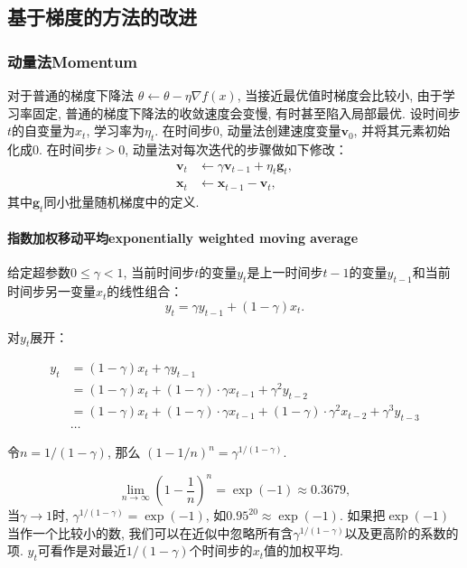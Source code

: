 \subsection{基于梯度的方法的改进}
 \subsubsection{动量法Momentum}
 对于普通的梯度下降法 $\theta \leftarrow \theta - \eta \nabla f(x)$,  当接近最优值时梯度会比较小, 由于学习率固定, 普通的梯度下降法的收敛速度会变慢, 有时甚至陷入局部最优.   
设时间步$t$的自变量为${x}_t$, 学习率为$\eta_t$. 
在时间步$0$, 动量法创建速度变量$\mathbf{v}_0$, 并将其元素初始化成0. 在时间步$t>0$, 动量法对每次迭代的步骤做如下修改：
 $$
 \begin{aligned}
 \mathbf{v}_t &\leftarrow \gamma \mathbf{v}_{t-1} + \eta_t \mathbf{g}_t,  \\
 \mathbf{x}_t &\leftarrow \mathbf{x}_{t-1} - \mathbf{v}_t, 
 \end{aligned}
 $$
 其中$\mathbf{g}_t$同小批量随机梯度中的定义.

 \paragraph{指数加权移动平均exponentially weighted moving average}
 给定超参数$0 \leq \gamma < 1$, 当前时间步$t$的变量$y_t$是上一时间步$t-1$的变量$y_{t-1}$和当前时间步另一变量$x_t$的线性组合：
 $$y_t = \gamma y_{t-1} + (1-\gamma) x_t.$$

对$y_t$展开：

 $$
 \begin{aligned}
 y_t  &= (1-\gamma) x_t + \gamma y_{t-1}\\
          &= (1-\gamma)x_t + (1-\gamma) \cdot \gamma x_{t-1} + \gamma^2y_{t-2}\\
          &= (1-\gamma)x_t + (1-\gamma) \cdot \gamma x_{t-1} + (1-\gamma) \cdot \gamma^2x_{t-2} + \gamma^3y_{t-3}\\
          &\ldots
 \end{aligned}
 $$
 
 令$n = 1/(1-\gamma)$, 那么 $\left(1-1/n\right)^n = \gamma^{1/(1-\gamma)}$. 
 
 $$ \lim_{n \rightarrow \infty}  \left(1-\frac{1}{n}\right)^n = \exp(-1) \approx 0.3679, $$
 当$\gamma \rightarrow 1$时, $\gamma^{1/(1-\gamma)}=\exp(-1)$, 如$0.95^{20} \approx \exp(-1)$. 如果把$\exp(-1)$当作一个比较小的数, 我们可以在近似中忽略所有含$\gamma^{1/(1-\gamma)}$以及更高阶的系数的项.  
 $y_t$可看作是对最近$1/(1-\gamma)$个时间步的$x_t$值的加权平均. 


